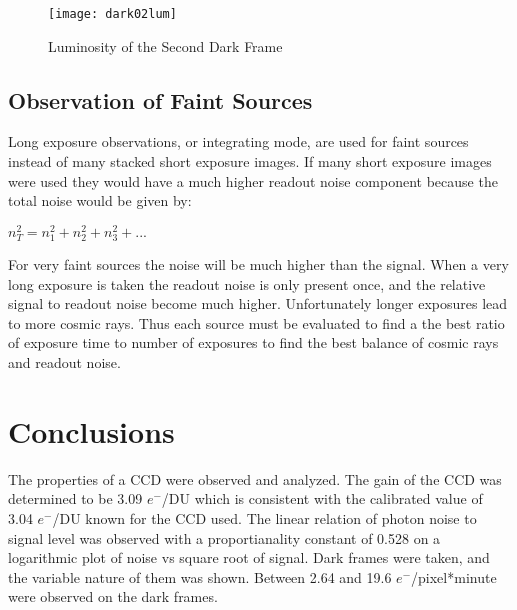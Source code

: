 \documentclass{article}
\begin{document}
\begin{figure}
\texttt{[image: dark02lum]} %
\caption{Luminosity of the Second Dark Frame}
\end{figure}
\subsection{Observation of Faint Sources}
Long exposure observations, or integrating mode, are used for faint sources instead of many stacked short exposure images. If many short exposure images were used they would have a much higher readout noise component because the total noise would be given by:

$n_T^2=n_1^2+n_2^2+n_3^2+...$

For very faint sources the noise will be much higher than the signal. When a very long exposure is taken the readout noise is only present once, and the relative signal to readout noise become much higher. Unfortunately longer exposures lead to more cosmic rays. Thus each source must be evaluated to find a the best ratio of exposure time to number of exposures to find the best balance of cosmic rays and readout noise. 

\section{Conclusions}
The properties of a CCD were observed and analyzed. The gain of the CCD was determined to be 3.09 $e^-$/DU which is consistent with the calibrated value of 3.04 $e^-$/DU known for the CCD used. The linear relation of photon noise to signal level was observed with a proportianality constant of 0.528 on a logarithmic plot of noise vs square root of signal. Dark frames were taken, and the variable nature of them was shown. Between 2.64 and 19.6 $e^-$/pixel*minute were observed on the dark frames.
\end{document}
